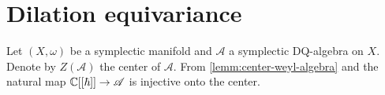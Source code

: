 \chapter{Dilation equivariance}\label{ch:dilation}
Let $(X, \omega)$ be a symplectic manifold and $\mathscr{A}$ a symplectic DQ-algebra on $X$. Denote by $Z(\mathscr{A})$ the center of $\mathscr{A}$. From \cref{lemm:center-weyl-algebra} and  the natural map ${\mathbb C}[ [\hbar]] \to \mathscr{A}$ is injective onto the center.